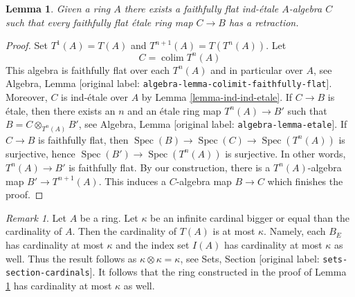 \documentclass[10pt,a4paper]{article}
\theoremstyle{plain}
\newtheorem{lemma}[subsection]{Lemma}
\theoremstyle{definition}
\theoremstyle{remark}
\newtheorem{remark}[subsection]{Remark}
\numberwithin{equation}{subsection}
\def\colim{\mathop{\mathrm{colim}}\nolimits}
\def\Spec{\mathop{\mathrm{Spec}}}
\begin{document}
\begin{lemma}
\label{lemma-first-construction}
Given a ring $A$ there exists a faithfully flat ind-\'etale $A$-algebra $C$
such that every faithfully flat \'etale ring map $C \to B$ has a retraction.
\end{lemma}

\begin{proof}
Set $T^1(A) = T(A)$ and $T^{n + 1}(A) = T(T^n(A))$. Let
$$
C = \colim T^n(A)
$$
This algebra is faithfully flat over each $T^n(A)$ and in particular
over $A$, see
Algebra, Lemma \textnormal{[original label: \nolinkurl{algebra-lemma-colimit-faithfully-flat}]}.
Moreover, $C$ is ind-\'etale over $A$ by Lemma \ref{lemma-ind-ind-etale}.
If $C \to B$ is \'etale, then there exists an $n$ and an \'etale
ring map $T^n(A) \to B'$ such that $B = C \otimes_{T^n(A)} B'$, see
Algebra, Lemma \textnormal{[original label: \nolinkurl{algebra-lemma-etale}]}.
If $C \to B$ is faithfully flat, then $\Spec(B) \to \Spec(C) \to \Spec(T^n(A))$
is surjective, hence $\Spec(B') \to \Spec(T^n(A))$ is surjective.
In other words, $T^n(A) \to B'$ is faithfully flat.
By our construction, there is a $T^n(A)$-algebra map
$B' \to T^{n + 1}(A)$. This induces a $C$-algebra map $B \to C$
which finishes the proof.
\end{proof}

\begin{remark}
\label{remark-size-T}
Let $A$ be a ring. Let $\kappa$ be an infinite cardinal bigger or
equal than the cardinality of $A$. Then the cardinality of $T(A)$
is at most $\kappa$. Namely, each $B_E$ has cardinality at most
$\kappa$ and the index set $I(A)$ has cardinality at most $\kappa$
as well. Thus the result follows as $\kappa \otimes \kappa = \kappa$, see
Sets, Section \textnormal{[original label: \nolinkurl{sets-section-cardinals}]}. It follows that the
ring constructed in the proof of Lemma \ref{lemma-first-construction}
has cardinality at most $\kappa$ as well.
\end{remark}
\end{document}
